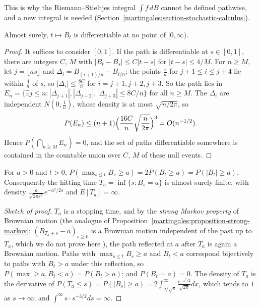 This is why the Riemann--Stieltjes integral $\int f\,dB$ cannot be defined pathwise, and a new integral is needed (Section~\ref{martingales:section-stochastic-calculus}).

\begin{theorem}\label{martingales:theorem-nowhere-differentiable}
Almost surely, $t \mapsto B_t$ is differentiable at no point of $[0, \infty)$.
\end{theorem}

\begin{proof}
It suffices to consider $[0, 1]$. If the path is differentiable at $s \in [0, 1]$, there are integers $C$, $M$ with $|B_t - B_s| \leq C|t - s|$ for $|t - s| \leq 4/M$. For $n \geq M$, let $j = \lfloor ns\rfloor$ and $\Delta_i = B_{(i+1)/n} - B_{i/n}$;
the points $\frac in$ for $j + 1 \leq i \leq j + 4$ lie within $\frac4n$ of $s$, so $|\Delta_i| \leq \frac{8C}{n}$ for $i = j + 1, j + 2, j + 3$. So the path lies in
$E_n = \{\exists j \leq n : |\Delta_{j+1}|, |\Delta_{j+2}|, |\Delta_{j+3}| \leq 8C/n\}$ for all $n \geq M$. The $\Delta_i$ are independent $N(0, \frac1n)$, whose density is at most $\sqrt{n/2\pi}$, so
\[
P(E_n) \leq (n + 1)\Bigl(\frac{16C}{n}\sqrt{\frac{n}{2\pi}}\Bigr)^3 = O(n^{-1/2}).
\]
Hence $P(\bigcap_{n \geq M}E_n) = 0$, and the set of paths differentiable somewhere is contained in the countable union over $C$, $M$ of these null events.
\end{proof}

\begin{theorem}\label{martingales:theorem-reflection}
For $a > 0$ and $t > 0$, $P(\max_{s \leq t}B_s \geq a) = 2P(B_t \geq a) = P(|B_t| \geq a)$. Consequently the hitting time $T_a = \inf\{s : B_s = a\}$ is almost surely finite, with density $\frac{a}{\sqrt{2\pi s^3}}e^{-a^2/2s}$ and
$E[T_a] = \infty$.
\end{theorem}

\begin{proof}[Sketch of proof]
$T_a$ is a stopping time, and by the \emph{strong Markov property} of Brownian motion (the analogue of Proposition~\ref{martingales:proposition-strong-markov}: $(B_{T_a + s} - a)_{s \geq 0}$ is a Brownian motion independent of the past
up to $T_a$, which we do not prove here \cite{morters-peres}), the path reflected at $a$ after $T_a$ is again a Brownian motion. Paths with $\max_{s \leq t}B_s \geq a$ and $B_t < a$ correspond bijectively to paths with $B_t > a$ under
this reflection, so $P(\max \geq a, B_t < a) = P(B_t > a)$; and $P(B_t = a) = 0$. The density of $T_a$ is the derivative of $P(T_a \leq s) = P(|B_s| \geq a) = 2\int_{a/\sqrt s}^\infty\frac{e^{-x^2/2}}{\sqrt{2\pi}}dx$, which tends to $1$ as
$s \to \infty$; and $\int^\infty s\cdot s^{-3/2}ds = \infty$.
\end{proof}

